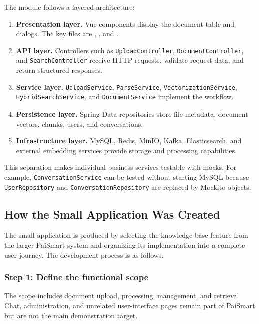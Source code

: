 \documentclass[11pt,a4paper]{article}
\begin{document}
The module follows a layered architecture:
\begin{enumerate}[leftmargin=2em]
  \item \textbf{Presentation layer.} Vue components display the document table and
        dialogs. The key files are
        ,
        , and
        .
  \item \textbf{API layer.} Controllers such as \texttt{UploadController},
        \texttt{DocumentController}, and \texttt{SearchController} receive HTTP
        requests, validate request data, and return structured responses.
  \item \textbf{Service layer.} \texttt{UploadService}, \texttt{ParseService},
        \texttt{VectorizationService}, \texttt{HybridSearchService}, and
        \texttt{DocumentService} implement the workflow.
  \item \textbf{Persistence layer.} Spring Data repositories store file metadata,
        document vectors, chunks, users, and conversations.
  \item \textbf{Infrastructure layer.} MySQL, Redis, MinIO, Kafka, Elasticsearch, and
        external embedding services provide storage and processing capabilities.
\end{enumerate}

This separation makes individual business services testable with mocks. For example,
\texttt{ConversationService} can be tested without starting MySQL because
\texttt{UserRepository} and \texttt{ConversationRepository} are replaced by Mockito
objects.

\subsection{How the Small Application Was Created}

The small application is produced by selecting the knowledge-base feature from the
larger PaiSmart system and organizing its implementation into a complete user journey.
The development process is as follows.

\subsubsection{Step 1: Define the functional scope}

The scope includes document upload, processing, management, and retrieval. Chat,
administration, and unrelated user-interface pages remain part of PaiSmart but are not
the main demonstration target.
\end{document}
